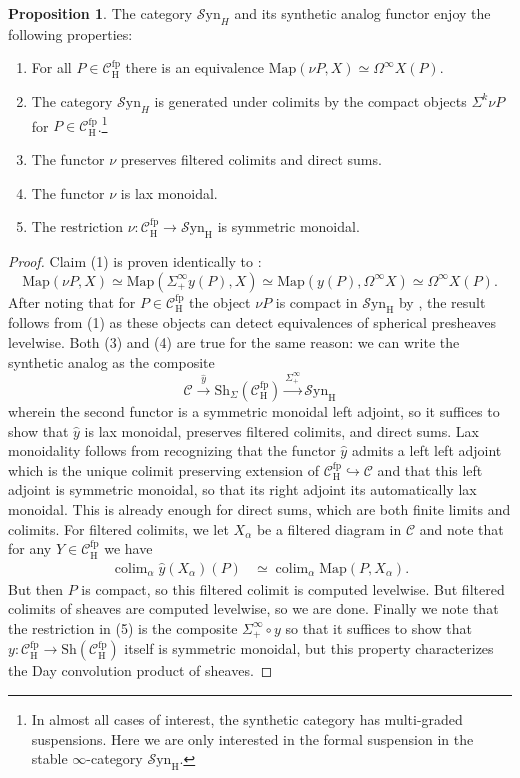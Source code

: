 \documentclass[10pt]{amsart}
\theoremstyle{definition}
\numberwithin{figure}{section}
\numberwithin{equation}{section}
\newtheorem{proposition}[figure]{Proposition}
\newcommand{\cC}{\mathcal{C}}
\theoremstyle{cited}
\newcommand{\colim}{\operatorname{colim}}
\newcommand{\Map}{\mathrm{Map}}
\newcommand{\Sh}{\mathrm{Sh}}
\newcommand{\fp}{\mathrm{fp}}
\newcommand{\Syn}{\mathcal{S}\mathrm{yn}}
\renewcommand{\H}{\mathrm{H}}
\begin{document}
\begin{proposition}\label{prop:analogprops}
   The category $\Syn_H$ and its synthetic analog functor enjoy the following properties:
   \begin{enumerate}
    \item For all $P\in \cC_\H^\fp$ there is an equivalence $\Map(\nu P, X)\simeq \Omega^\infty X(P)$.
    \item The category $\Syn_H$ is generated under colimits by the compact objects $\Sigma^{k}\nu P$ for $P\in \cC_\H^\fp$.\footnote{In almost all cases of interest, the synthetic category has multi-graded suspensions. Here we are only interested in the formal suspension in the stable $\infty$-category $\Syn_\H$.}
    \item The functor $\nu$ preserves filtered colimits and direct sums.
    \item The functor $\nu$ is lax monoidal.
    \item The restriction $\nu:\cC_\H^\fp\to \Syn_\H$ is symmetric monoidal.
   \end{enumerate}  
\end{proposition}

\begin{proof}
  Claim (1) is proven identically to \cite[Lemma 4.11]{Pst22}:
  \[
  \Map(\nu P, X)\simeq \Map(\Sigma_+^\infty y(P), X)\simeq \Map(y(P), \Omega^\infty X)\simeq \Omega^\infty X(P).
  \]
  After noting that for $P\in \cC_\H^\fp$ the object $\nu P$ is compact in $\Syn_\H$ by \cite[Cor. 4.12]{Pst22}, the result follows from (1) as these objects can detect equivalences of spherical presheaves levelwise. Both (3) and (4) are true for the same reason: we can write the synthetic analog as the composite
  \[
  \cC\xrightarrow{\hat y} \Sh_\Sigma(\cC_\H^\fp) \xrightarrow{\Sigma_+^\infty}\Syn_\H
  \]
  wherein the second functor is a symmetric monoidal left adjoint, so it suffices to show that $\hat y$ is lax monoidal, preserves filtered colimits, and direct sums. Lax monoidality follows from recognizing that the functor $\hat y$ admits a left left adjoint which is the unique colimit preserving extension of $\cC^\fp_\H\hookrightarrow \cC$ and that this left adjoint is symmetric monoidal, so that its right adjoint its automatically lax monoidal. This is already enough for direct sums, which are both finite limits and colimits. For filtered colimits, we let $X_\alpha$ be a filtered diagram in $\cC$ and note that for any $Y\in \cC_\H^\fp$ we have
  \begin{align*}
    \colim_\alpha \hat y(X_\alpha)(P) & \simeq \colim_\alpha \Map(P, X_\alpha).
  \end{align*}
  But then $P$ is compact, so this filtered colimit is computed levelwise. But filtered colimits of sheaves are computed levelwise, so we are done. Finally we note that the restriction in (5) is the composite $\Sigma^\infty_+ \circ y$ so that it suffices to show that $y:\cC_\H^\fp\to \Sh(\cC_\H^\fp)$ itself is symmetric monoidal, but this property characterizes the Day convolution product of sheaves.
\end{proof}
\end{document}
